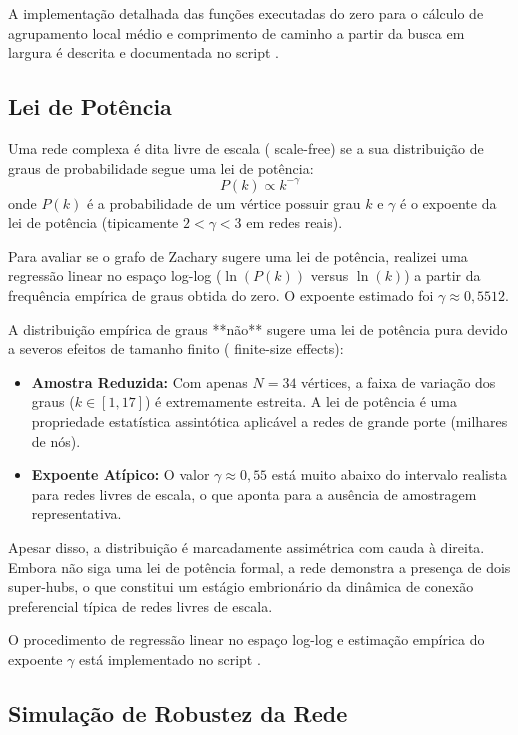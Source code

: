 \documentclass[sigconf]{webmedia}
\begin{document}
A implementação detalhada das funções executadas do zero para o cálculo de agrupamento local médio e comprimento de caminho a partir da busca em largura é descrita e documentada no script .

\subsection{Lei de Potência}
\label{subsec:power_law}

Uma rede complexa é dita livre de escala ( {scale-free}) se a sua distribuição de graus de probabilidade segue uma lei de potência:
\begin{equation}
    P(k) \propto k^{-\gamma}
\end{equation}
onde $P(k)$ é a probabilidade de um vértice possuir grau $k$ e $\gamma$ é o expoente da lei de potência (tipicamente $2 < \gamma < 3$ em redes reais).

Para avaliar se o grafo de Zachary sugere uma lei de potência, realizei uma regressão linear no espaço log-log ($\ln(P(k))$ versus $\ln(k)$) a partir da frequência empírica de graus obtida do zero. O expoente estimado foi $\gamma \approx 0,5512$.

A distribuição empírica de graus **não** sugere uma lei de potência pura devido a severos efeitos de tamanho finito ( {finite-size effects}):
\begin{itemize}
    \item \textbf{Amostra Reduzida:} Com apenas $N=34$ vértices, a faixa de variação dos graus ($k \in [1, 17]$) é extremamente estreita. A lei de potência é uma propriedade estatística assintótica aplicável a redes de grande porte (milhares de nós).
    \item \textbf{Expoente Atípico:} O valor $\gamma \approx 0,55$ está muito abaixo do intervalo realista para redes livres de escala, o que aponta para a ausência de amostragem representativa.
\end{itemize}
Apesar disso, a distribuição é marcadamente assimétrica com cauda à direita. Embora não siga uma lei de potência formal, a rede demonstra a presença de dois super-hubs, o que constitui um estágio embrionário da dinâmica de conexão preferencial típica de redes livres de escala.

O procedimento de regressão linear no espaço log-log e estimação empírica do expoente $\gamma$ está implementado no script .

\subsection{Simulação de Robustez da Rede}
\label{subsec:robustness}
\end{document}
